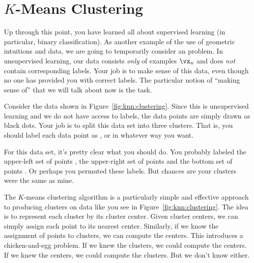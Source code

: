 
\section[K-Means Clustering]{$K$-Means Clustering}
\label{sec:knn:kmeans}

Up through this point, you have learned all about supervised learning
(in particular, binary classification).  As another example of the use
of geometric intuitions and data, we are going to temporarily consider
an  problem.  In unsupervised learning,
our data consists \emph{only} of examples $\vx_n$ and does \emph{not}
contain corresponding labels.  Your job is to make sense of this data,
even though no one has provided you with correct labels.  The
particular notion of ``making sense of'' that we will talk about now
is the  task.


Consider the data shown in Figure~\ref{fig:knn:clustering}.  Since
this is unsupervised learning and we do not have access to labels, the
data points are simply drawn as black dots.  Your job is to split this
data set into three clusters.  That is, you should label each data
point as ,  or  in whatever way you want.

For this data set, it's pretty clear what you should do.  You probably
labeled the upper-left set of points , the upper-right set of
points  and the bottom set of points .  Or perhaps
you permuted these labels.  But chances are your clusters were the
same as mine.

The $K$-means clustering algorithm is a particularly simple and
effective approach to producing clusters on data like you see in
Figure~\ref{fig:knn:clustering}.  The idea is to represent each
cluster by its cluster center.  Given cluster centers, we can simply
assign each point to its nearest center.  Similarly, if we know the
assignment of points to clusters, we can compute the centers.  This
introduces a chicken-and-egg problem.  If we knew the clusters, we
could compute the centers.  If we knew the centers, we could compute
the clusters.  But we don't know either.


